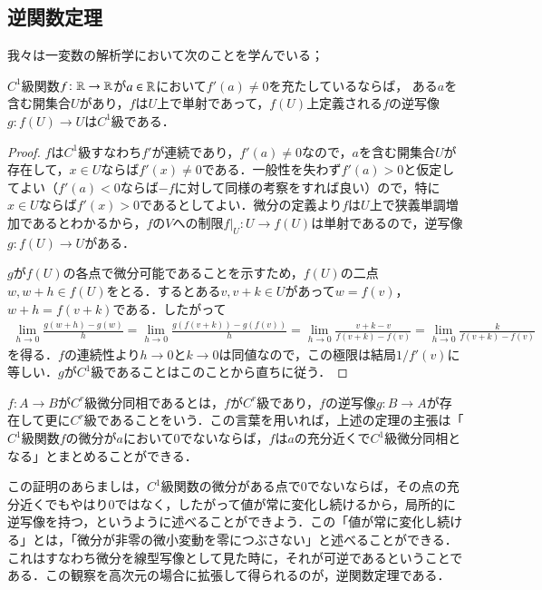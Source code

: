 \subsection{逆関数定理}

我々は一変数の解析学において次のことを学んでいる；

\begin{prop}
$C^1$級関数$f \colon \mathbb{R} \to \mathbb{R}$が$a \in \mathbb{R}$において$f'(a) \neq 0$を充たしているならば， ある$a$を含む開集合$U$があり，$f$は$U$上で単射であって，$f(U)$上定義される$f$の逆写像$g \colon f(U) \to U$は$C^1$級である．
\end{prop}

\begin{proof}
$f$は$C^1$級すなわち$f'$が連続であり，$f'(a) \neq 0$なので，$a$を含む開集合$U$が存在して，$x \in U$ならば$f'(x) \neq 0$である．一般性を失わず$f'(a) > 0$と仮定してよい（$f'(a) < 0$ならば$-f$に対して同様の考察をすれば良い）ので，特に$x \in U$ならば$f'(x) > 0$であるとしてよい．微分の定義より$f$は$U$上で狭義単調増加であるとわかるから，$f$の$V$への制限$f|_U \colon U \to f(U)$は単射であるので，逆写像$g \colon f(U) \to U$がある．

$g$が$f(U)$の各点で微分可能であることを示すため，$f(U)$の二点$w, w+h \in f(U)$をとる．するとある$v, v+k \in U$があって$w = f(v)$，$w+h = f(v+k)$である．したがって
\begin{align}
\lim_{h \to 0} \frac{g(w+h) - g(w)}{h} = \lim_{h \to 0} \frac{g(f(v+k)) - g(f(v))}{h} = \lim_{h \to 0} \frac{v+k - v}{f(v+k) - f(v)} = 
\lim_{h \to 0} \frac{k}{f(v+k) - f(v)}
\end{align}を得る．$f$の連続性より$h \to 0$と$k \to 0$は同値なので，この極限は結局$1/f'(v)$に等しい．$g$が$C^1$級であることはこのことから直ちに従う．
\end{proof}

\begin{defi}
$f \colon A \to B$が$C^r$級微分同相であるとは，$f$が$C^r$級であり，$f$の逆写像$g \colon B \to A$が存在して更に$C^r$級であることをいう．この言葉を用いれば，上述の定理の主張は「$C^1$級関数$f$の微分が$a$において0でないならば，$f$は$a$の充分近くで$C^1$級微分同相となる」とまとめることができる．
\end{defi}

この証明のあらましは，$C^1$級関数の微分がある点で0でないならば，その点の充分近くでもやはり0ではなく，したがって値が常に変化し続けるから，局所的に逆写像を持つ，というように述べることができよう．この「値が常に変化し続ける」とは，「微分が非零の微小変動を零につぶさない」と述べることができる．これはすなわち微分を線型写像として見た時に，それが可逆であるということである．この観察を高次元の場合に拡張して得られるのが，逆関数定理である．

